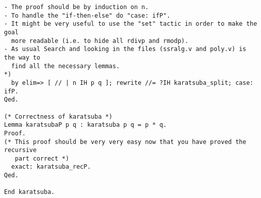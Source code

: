 \begin{verbatim}
- The proof should be by induction on n.
- To handle the "if-then-else" do "case: ifP".
- It might be very useful to use the "set" tactic in order to make the goal
  more readable (i.e. to hide all rdivp and rmodp).
- As usual Search and looking in the files (ssralg.v and poly.v) is the way to
  find all the necessary lemmas.
*)
  by elim=> [ // | n IH p q ]; rewrite //= ?IH karatsuba_split; case: ifP.
Qed.

(* Correctness of karatsuba *)
Lemma karatsubaP p q : karatsuba p q = p * q.
Proof.
(* This proof should be very very easy now that you have proved the recursive
   part correct *)
  exact: karatsuba_recP.
Qed.

End karatsuba.
\end{verbatim}
